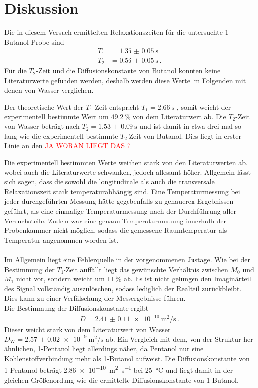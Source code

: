\section{Diskussion}
Die in diesem Versuch ermittelten Relaxationszeiten für die untersuchte 1-Butanol-Probe sind
\begin{align*}
  T_1 &= \SI{1.35(005)}{\second} \\
  T_2 &= \SI{0.56(005)}{\second} \, .
\end{align*}
Für die $T_2$-Zeit und die Diffusionskonstante von Butanol konnten keine Literaturwerte gefunden werden, deshalb werden diese Werte im Folgenden mit denen von Wasser verglichen.

Der theoretische Wert der $T_1$-Zeit entspricht $T_1 = \SI{2.66}{\second}$ \cite{T1}, somit weicht der experimentell bestimmte Wert um $\SI{49.2}{\percent}$ von dem Literaturwert ab.
Die $T_2$-Zeit von Wasser beträgt nach \cite{chang} $T_2 = \SI{1.53(9)}{\second}$ und ist damit in etwa drei mal so lang wie die experimentell bestimmte $T_2$-Zeit von Butanol.
Dies liegt in erster Linie an den \textcolor{red}{\Huge JA WORAN LIEGT DAS ?}

Die experimentell bestimmten Werte weichen stark von den Literaturwerten ab, wobei auch die Literaturwerte schwanken, jedoch
allesamt höher.
Allgemein lässt sich sagen, dass die sowohl die longitudinale als auch die transversale Relaxationszeit stark temperaturabhängig
sind. Eine Temperaturmessung bei jeder durchgeführten Messung hätte gegebenfalls zu genaueren Ergebnissen geführt,
als eine einmalige Temperaturmessung nach der Durchführung aller Versuchsteile.
Zudem war eine genaue Temperaturmessung innerhalb der Probenkammer nicht möglich, sodass die gemessene Raumtemperatur als
Temperatur angenommen worden ist. \\
\\
Im Allgemein liegt eine Fehlerquelle in der vorgenommenen Justage. Wie bei der Bestimmung der $T_1$-Zeit auffällt liegt
das gewünschte Verhältnis zwischen $M_0$ und $M_1$ nicht vor, sondern weicht um $\SI{11}{\percent}$ ab.
Es ist nicht gelungen den Imaginärteil des Signal vollständig auszulöschen, sodass lediglich der Realteil zurückbleibt.
Dies kann zu einer Verfälschung der Messergebnisse führen. \\


Die Bestimmung der Diffusionskonstante ergibt
\begin{align*}
  D = \SI{2.41(011)e-10}{\square\meter\per\second}\,.
\end{align*}
Dieser weicht stark von dem Literaturwert von Wasser $D_\text{W} = \SI{2.57(2)e-9}{\square\meter\per\second}$ \cite{wang} ab.
Ein Vergleich mit dem, von der Struktur her ähnlichen, 1-Pentanol liegt allerdings näher, da Pentanol nur eine Kohlenstoffverbindung mehr als 1-Butanol aufweist.
Die Diffusionskonstante von 1-Pentanol beträgt \SI{2.86e-10}{\square\meter\per\second} bei \SI{25}{\degreeCelsius} \cite{Holz} und liegt damit in der gleichen Größenordung wie die ermittelte Diffusionskonstante von 1-Butanol.


